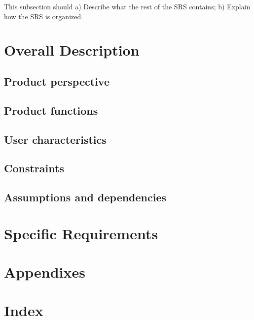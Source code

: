 \documentclass[10pt,letterpaper,onecolumn,draftclsnofoot]{IEEEtran}
\begin{document}
This subsection should
a) Describe what the rest of the SRS contains;
b) Explain how the SRS is organized.
\clearpage

\section{Overall Description}

\subsection{Product perspective}

\subsection{Product functions}

\subsection{User characteristics}

\subsection{Constraints}

\subsection{Assumptions and dependencies}

\section{Specific Requirements}

\clearpage
\section{Appendixes}

\section{Index}
\end{document}
